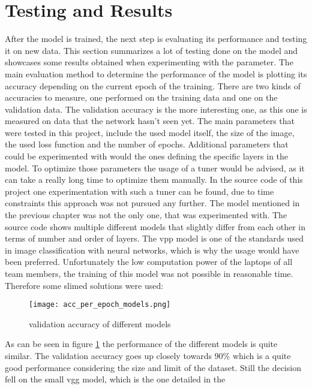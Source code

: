 \section{Testing and Results}

After the model is trained, the next step is evaluating its performance and
testing it on new data. This section summarizes a lot of testing done on the
model and showcases some results obtained when experimenting with the parameter.
\newline
The main evaluation method to determine the performance of the model is plotting
its accuracy depending on the current epoch of the training. There are two kinds
of accuracies to measure, one performed on the training data and one on the
validation data. The validation accuracy is the more interesting one, as this
one is measured on data that the network hasn't seen yet.
\newline
The main parameters that were tested in this project, include the used model
itself, the size of the image, the used loss function and the number of epochs.
Additional parameters that could be experimented with would the ones defining
the specific layers in the model. To optimize those parameters the usage of a
tuner would be advised, as it can take a really long time to optimize them
manually. In the source code of this project one experimentation with such a
tuner can be found, due to time constraints this approach was not pursued any
further.
\newline
The model mentioned in the previous chapter was not the only one, that was
experimented with. The source code shows multiple different models that slightly
differ from each other in terms of number and order of layers. The vpp model is
one of the standards used in image classification with neural networks, which is
why the usage would have been preferred. Unfortunately the low computation power
of the laptops of all team members, the training of this model was not possible
in reasonable time. Therefore some slimed solutions were used:
\begin{figure}
    \centering
    \texttt{[image: acc\_per\_epoch\_models.png]}
    \caption{validation accuracy of different models}
    \label{fig:models}
\end{figure}
As can be seen in figure \ref{fig:models} the performance of the different
models is quite similar. The validation accuracy goes up closely towards 90\%
which is a quite good performance considering the size and limit of the dataset.
Still the decision fell on the small vgg model, which is the one detailed in the
